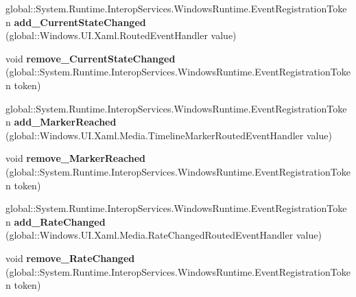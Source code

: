 \begin{DoxyCompactItemize}
\item 
\mbox{\label{class_windows_1_1_u_i_1_1_xaml_1_1_controls_1_1_media_element_ae6fc988c596577fb1e064d953f8d6bdf}} 
global\+::\+System.\+Runtime.\+Interop\+Services.\+Windows\+Runtime.\+Event\+Registration\+Token {\bfseries add\+\_\+\+Current\+State\+Changed} (global\+::\+Windows.\+U\+I.\+Xaml.\+Routed\+Event\+Handler value)
\item 
\mbox{\label{class_windows_1_1_u_i_1_1_xaml_1_1_controls_1_1_media_element_aebdc30f4274c70b12f3c5f0fb3aaf725}} 
void {\bfseries remove\+\_\+\+Current\+State\+Changed} (global\+::\+System.\+Runtime.\+Interop\+Services.\+Windows\+Runtime.\+Event\+Registration\+Token token)
\item 
\mbox{\label{class_windows_1_1_u_i_1_1_xaml_1_1_controls_1_1_media_element_a6083c0220c513d85efe6176f20144ebf}} 
global\+::\+System.\+Runtime.\+Interop\+Services.\+Windows\+Runtime.\+Event\+Registration\+Token {\bfseries add\+\_\+\+Marker\+Reached} (global\+::\+Windows.\+U\+I.\+Xaml.\+Media.\+Timeline\+Marker\+Routed\+Event\+Handler value)
\item 
\mbox{\label{class_windows_1_1_u_i_1_1_xaml_1_1_controls_1_1_media_element_a0808fb3f0499ca8aec86e05b44b1379c}} 
void {\bfseries remove\+\_\+\+Marker\+Reached} (global\+::\+System.\+Runtime.\+Interop\+Services.\+Windows\+Runtime.\+Event\+Registration\+Token token)
\item 
\mbox{\label{class_windows_1_1_u_i_1_1_xaml_1_1_controls_1_1_media_element_ad94df9e8fcffeae53d73f460020d8cf9}} 
global\+::\+System.\+Runtime.\+Interop\+Services.\+Windows\+Runtime.\+Event\+Registration\+Token {\bfseries add\+\_\+\+Rate\+Changed} (global\+::\+Windows.\+U\+I.\+Xaml.\+Media.\+Rate\+Changed\+Routed\+Event\+Handler value)
\item 
\mbox{\label{class_windows_1_1_u_i_1_1_xaml_1_1_controls_1_1_media_element_a73c0ccdb24c5c0626b36b25df7adc1fc}} 
void {\bfseries remove\+\_\+\+Rate\+Changed} (global\+::\+System.\+Runtime.\+Interop\+Services.\+Windows\+Runtime.\+Event\+Registration\+Token token)

\end{DoxyCompactItemize}
